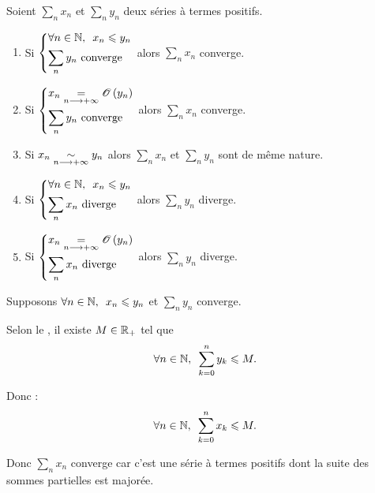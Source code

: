 \begin{theo}
Soient \(\sum_nx_n\) et \(\sum_ny_n\) deux séries à termes positifs.

\begin{enumerate}
    \item Si \(\begin{dcases}
        \quantifs{\forall n\in\N}x_n\leq y_n \\
        \sum_ny_n\text{ converge}
    \end{dcases}\) alors \(\sum_nx_n\) converge. \\
    \item Si \(\begin{dcases}
        x_n\underset{n\longrightarrow+\infty}{=}\mathscr{O}\left(y_n\right) \\
        \sum_ny_n\text{ converge}
    \end{dcases}\) alors \(\sum_nx_n\) converge. \\
    \item Si \(x_n\underset{n\longrightarrow+\infty}{\sim}y_n\) alors \(\sum_nx_n\) et \(\sum_ny_n\) sont de même nature. \\
    \item Si \(\begin{dcases}
        \quantifs{\forall n\in\N}x_n\leq y_n \\
        \sum_nx_n\text{ diverge}
    \end{dcases}\) alors \(\sum_ny_n\) diverge. \\
    \item Si \(\begin{dcases}
        x_n\underset{n\longrightarrow+\infty}{=}\mathscr{O}\left(y_n\right) \\
        \sum_nx_n\text{ diverge}
    \end{dcases}\) alors \(\sum_ny_n\) diverge.
\end{enumerate}
\end{theo}

\begin{dem}[1]
Supposons \(\quantifs{\forall n\in\N}x_n\leq y_n\) et \(\sum_ny_n\) converge.

Selon le , il existe \(M\in\mathbb{R}_+\) tel que \[\quantifs{\forall n\in\N}\sum_{k=0}^ny_k\leq M.\]

Donc : \[\quantifs{\forall n\in\N}\sum_{k=0}^nx_k\leq M.\]

Donc \(\sum_nx_n\) converge car c'est une série à termes positifs dont la suite des sommes partielles est majorée.
\end{dem}

